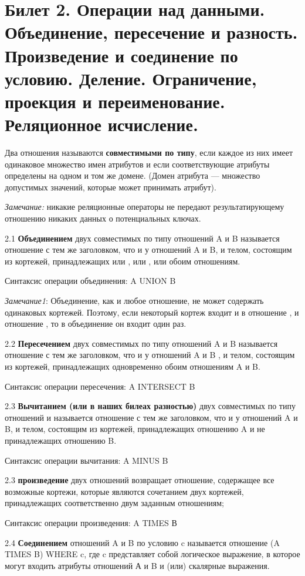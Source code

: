 \newpage
\section{Билет 2. Операции над данными. Объединение, пересечение и разность. Произведение и соединение по условию. Деление. Ограничение, проекция и переименование. Реляционное исчисление.}

Два отношения называются  \textbf{совместимыми по типу}, если каждое из них имеет одинаковое множество имен атрибутов и если соответствующие атрибуты определены на одном и том же домене. 
(Домен атрибута — множество допустимых значений, которые может принимать атрибут). 

\textit{Замечание:} никакие реляционные операторы не передают результатирующему отношению никаких данных о потенциальных ключах.

2.1 \textbf{Объединением} двух совместимых по типу отношений A и B называется отношение с тем же заголовком, что и у отношений A и B, и телом, состоящим из кортежей, принадлежащих или , или , или обоим отношениям.

Синтаксис операции объединения: A UNION B

\textit{Замечание1}: Объединение, как и любое отношение, не может содержать одинаковых кортежей. Поэтому, если некоторый кортеж входит и в отношение , и отношение , то в объединение он входит один раз.

2.2 \textbf{Пересечением} двух совместимых по типу отношений A и B называется отношение с тем же заголовком, что и у отношений A и B , и телом, состоящим из кортежей, принадлежащих одновременно обоим отношениям A и B.

Синтаксис операции пересечения: A INTERSECT B

2.3 \textbf{Вычитанием (или в наших билеах разностью)} двух совместимых по типу отношений  и  называется отношение с тем же заголовком, что и у отношений A и B, и телом, состоящим из кортежей, принадлежащих отношению A и не принадлежащих отношению B. 

Синтаксис операции вычитания: A MINUS B


2.3  \textbf{произведение}  двух отношений возвращает отношение, содержащее все возможные кортежи, которые являются сочетанием двух кортежей, принадлежащих соответственно двум заданным отношениям;

Синтаксис операции произведения: A TIMES В

2.4 \textbf{Соединением} отношений A и B по условию c называется отношение (A TIMES B) WHERE c, где c представляет собой логическое выражение, в которое могут входить атрибуты отношений А и B и (или) скалярные выражения.

